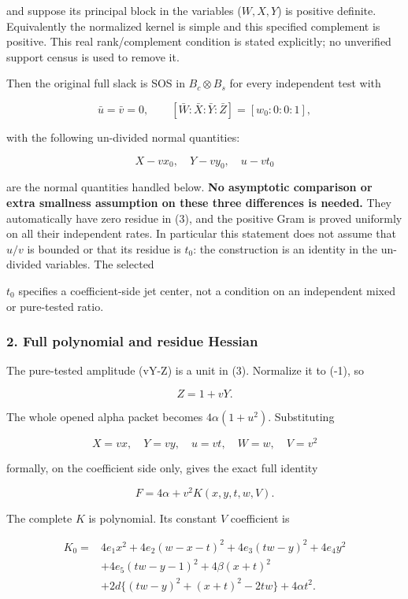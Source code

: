 and suppose its principal block in the variables (\(W,X,Y\)) is positive
definite. Equivalently the normalized kernel is simple and this specified
complement is positive. This real rank/complement condition is stated
explicitly; no unverified support census is used to remove it.

Then the original full slack is SOS in \(B_c\otimes B_s\) for every
independent test with

\[
\bar u=\bar v=0,\qquad
[\bar W:\bar X:\bar Y:\bar Z]=[w_0:0:0:1],
\tag{3}
\]

with the following un-divided normal quantities:

\[
X-vx_0,\quad Y-vy_0,\quad u-vt_0
\]

are the normal quantities handled below. \textbf{No asymptotic comparison or
extra smallness assumption on these three differences is needed.} They
automatically have zero residue in (3), and the positive Gram is proved
uniformly on all their independent rates. In particular this statement
does not assume that \(u/v\) is bounded or that its residue is \(t_0\): the
construction is an identity in the un-divided variables. The selected

\(t_0\) specifies a coefficient-side jet center, not a condition on an
independent mixed or pure-tested ratio.

\hypertarget{full-polynomial-and-residue-hessian}{%
\subsubsection*{2. Full polynomial and residue Hessian}\label{p03b551f2a9a0:full-polynomial-and-residue-hessian}}

The pure-tested amplitude (vY-Z) is a unit in (3). Normalize it to (-1),
so

\[
Z=1+vY.
\]

The whole opened alpha packet becomes \(4\alpha(1+u^2)\). Substituting

\[
X=vx,\quad Y=vy,\quad u=vt,\quad W=w,\quad V=v^2
\]

formally, on the coefficient side only, gives the exact full identity

\[
F=4\alpha+v^2K(x,y,t,w,V).
\tag{4}
\]

The complete \(K\) is polynomial. Its constant \(V\) coefficient is

\[
\begin{aligned}
K_0={}&4e_1x^2+4e_2(w-x-t)^2+4e_3(tw-y)^2+4e_4y^2\\
&+4e_5(tw-y-1)^2+4\beta(x+t)^2\\
&+2d\{(tw-y)^2+(x+t)^2-2tw\}+4\alpha t^2.
\end{aligned}
\tag{5}
\]

